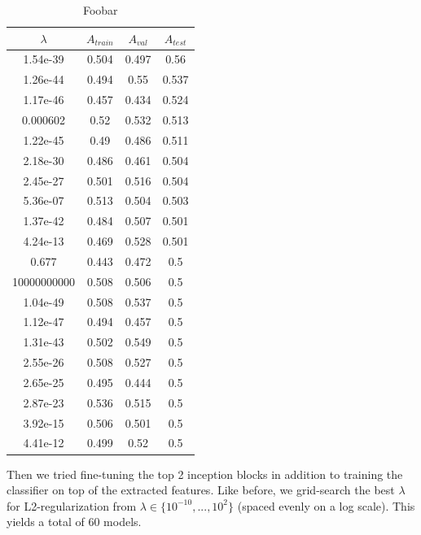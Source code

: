 \begin{table}[ht]
\centering
\begin{tabular}{ |c|c|c|c| }
\hline
$\lambda$ & $A_{train}$ & $A_{val}$ & $A_{test}$ \\
\hline
1.54e-39 & 0.504 & 0.497 & 0.56 \\
1.26e-44 & 0.494 & 0.55 & 0.537 \\
1.17e-46 & 0.457 & 0.434 & 0.524 \\
0.000602 & 0.52 & 0.532 & 0.513 \\
1.22e-45 & 0.49 & 0.486 & 0.511 \\
2.18e-30 & 0.486 & 0.461 & 0.504 \\
2.45e-27 & 0.501 & 0.516 & 0.504 \\
5.36e-07 & 0.513 & 0.504 & 0.503 \\
1.37e-42 & 0.484 & 0.507 & 0.501 \\
4.24e-13 & 0.469 & 0.528 & 0.501 \\
0.677 & 0.443 & 0.472 & 0.5 \\
10000000000 & 0.508 & 0.506 & 0.5 \\
1.04e-49 & 0.508 & 0.537 & 0.5 \\
1.12e-47 & 0.494 & 0.457 & 0.5 \\
1.31e-43 & 0.502 & 0.549 & 0.5 \\
2.55e-26 & 0.508 & 0.527 & 0.5 \\
2.65e-25 & 0.495 & 0.444 & 0.5 \\
2.87e-23 & 0.536 & 0.515 & 0.5 \\
3.92e-15 & 0.506 & 0.501 & 0.5 \\
4.41e-12 & 0.499 & 0.52 & 0.5 \\
\hline
\end{tabular}
\caption{Foobar}
\label{table:foobar}
\end{table}



Then we tried fine-tuning the top 2 inception blocks in addition to training the classifier on top of the extracted features. Like before, we grid-search the best $\lambda$ for L2-regularization from $\lambda \in \{10^{-10}, ..., 10^{2}\}$ (spaced evenly on a log scale). This yields a total of $60$ models.

